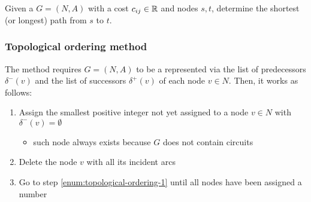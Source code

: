 \documentclass[english]{article}
\begin{document}
\begin{problem}
  Given a \DAG \(G = (N, A)\) with a cost \(c_{ij} \in \mathbb{R}\) and nodes \(s, t\), determine the shortest (or longest) path from \(s\) to \(t\).
\end{problem}

\subsubsection{Topological ordering method}

The method requires \(G = (N, A)\) to be a \DAG represented via the list of predecessors \(\delta^-(v)\) and the list of successors \(\delta^+(v)\) of each node \(v \in N\).
Then, it works as follows:

\begin{enumerate}[label=\arabic*., ref=(\arabic*)]
  \item\label{enum:topological-ordering-1} Assign the smallest positive integer not yet assigned to a node \(v \in N \) with \(\delta^-(v) = \emptyset\)
  \begin{itemize}[label=\(\rightarrow\)]
    \item such node always exists because \(G\) does not contain circuits
  \end{itemize}
  \item Delete the node \(v\) with all its incident arcs
  \item Go to step  \ref{enum:topological-ordering-1} until all nodes have been assigned a number
\end{enumerate}
\end{document}
